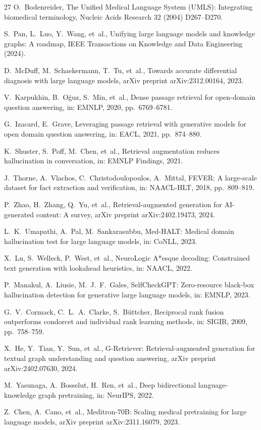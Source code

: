 \documentclass[preprint,12pt]{elsarticle}
\begin{document}
\begin{thebibliography}{27}
O.~Bodenreider, The Unified Medical Language System (UMLS): Integrating biomedical terminology, Nucleic Acids Research 32 (2004) D267--D270.

S.~Pan, L.~Luo, Y.~Wang, et~al., Unifying large language models and knowledge graphs: A roadmap, IEEE Transactions on Knowledge and Data Engineering (2024).

D.~McDuff, M.~Schaekermann, T.~Tu, et~al., Towards accurate differential diagnosis with large language models, arXiv preprint arXiv:2312.00164, 2023.

V.~Karpukhin, B.~O\u{g}uz, S.~Min, et~al., Dense passage retrieval for open-domain question answering, in: EMNLP, 2020, pp.~6769--6781.

G.~Izacard, E.~Grave, Leveraging passage retrieval with generative models for open domain question answering, in: EACL, 2021, pp.~874--880.

K.~Shuster, S.~Poff, M.~Chen, et~al., Retrieval augmentation reduces hallucination in conversation, in: EMNLP Findings, 2021.

J.~Thorne, A.~Vlachos, C.~Christodoulopoulos, A.~Mittal, FEVER: A large-scale dataset for fact extraction and verification, in: NAACL-HLT, 2018, pp.~809--819.

P.~Zhao, H.~Zhang, Q.~Yu, et~al., Retrieval-augmented generation for AI-generated content: A survey, arXiv preprint arXiv:2402.19473, 2024.

L.~K.~Umapathi, A.~Pal, M.~Sankarasubbu, Med-HALT: Medical domain hallucination test for large language models, in: CoNLL, 2023.

X.~Lu, S.~Welleck, P.~West, et~al., NeuroLogic A*esque decoding: Constrained text generation with lookahead heuristics, in: NAACL, 2022.

P.~Manakul, A.~Liusie, M.~J.~F.~Gales, SelfCheckGPT: Zero-resource black-box hallucination detection for generative large language models, in: EMNLP, 2023.

G.~V.~Cormack, C.~L.~A.~Clarke, S.~B\"uttcher, Reciprocal rank fusion outperforms condorcet and individual rank learning methods, in: SIGIR, 2009, pp.~758--759.

X.~He, Y.~Tian, Y.~Sun, et~al., G-Retriever: Retrieval-augmented generation for textual graph understanding and question answering, arXiv preprint arXiv:2402.07630, 2024.

M.~Yasunaga, A.~Bosselut, H.~Ren, et~al., Deep bidirectional language-knowledge graph pretraining, in: NeurIPS, 2022.

Z.~Chen, A.~Cano, et~al., Meditron-70B: Scaling medical pretraining for large language models, arXiv preprint arXiv:2311.16079, 2023.

\end{thebibliography}
\end{document}
